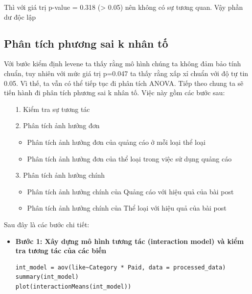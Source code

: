 \begin{itemize}
Thì với giá trị p-value = 0.318 (> 0.05) nên không có sự tương quan. Vậy phần dư độc lập

\subsection{Phân tích phương sai k nhân tố}
Với bước kiểm định levene ta thấy rằng mô hình chúng ta không đảm bảo tính chuẩn, tuy nhiên với mức giá trị p=0.047 ta thấy rằng xấp xỉ chuẩn với độ tự tin 0.05. Vì thế, ta vẫn có thể tiếp tục đi phân tích ANOVA.
Tiếp theo chung ta sẽ tiến hành đi phân tích phương sai k nhân tố. Việc này gồm các bước sau:
\begin{itemize}
    \item [1.] Kiểm tra sự tương tác
    \item [2.] Phân tích ảnh hưởng đơn
    \begin{itemize}
        \item Phân tích ảnh hưởng đơn của quảng cáo ở mỗi loại thể loại
        \item Phân tích ảnh hưởng đơn của thể loại trong việc sử dụng quảng cáo
    \end{itemize}
    \item [3.] Phân tích ảnh hưởng chính
    \begin{itemize}
        \item Phân tích ảnh hưởng chính của Quảng cáo với hiệu quả của bài post
        \item Phân tích ảnh hưởng chính của Thể loại với hiệu quả của bài post
    \end{itemize}
\end{itemize}

Sau đây là các bước chi tiết:
\begin{itemize}
    \item \textbf{Bước 1: Xây dựng mô hình tương tác (interaction model) và kiểm tra tương tác của các biến}

    \begin{lstlisting}
int_model = aov(like~Category * Paid, data = processed_data)
summary(int_model)
plot(interactionMeans(int_model))
    \end{lstlisting}


\end{itemize}
\end{itemize}
